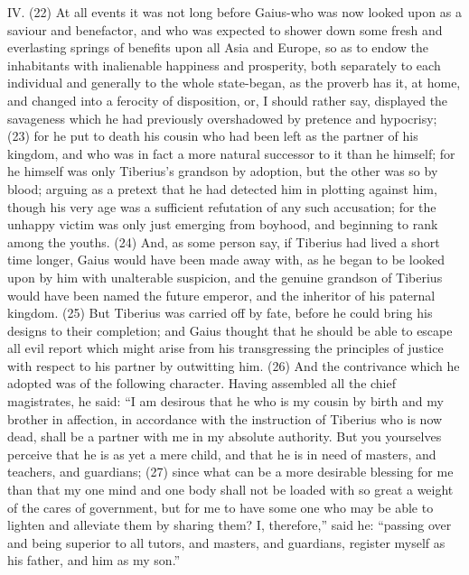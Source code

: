 IV. (22) At all events it was not long before Gaius-who was now looked upon as a saviour and
benefactor, and who was expected to shower down some fresh and everlasting springs of benefits
upon all Asia and Europe, so as to endow the inhabitants with inalienable happiness and prosperity,
both separately to each individual and generally to the whole state-began, as the proverb has it, at
home, and changed into a ferocity of disposition, or, I should rather say, displayed the savageness
which he had previously overshadowed by pretence and hypocrisy; (23) for he put to death his
cousin who had been left as the partner of his kingdom, and who was in fact a more natural
successor to it than he himself; for he himself was only Tiberius's grandson by adoption, but the
other was so by blood; arguing as a pretext that he had detected him in plotting against him, though
his very age was a sufficient refutation of any such accusation; for the unhappy victim was only
just emerging from boyhood, and beginning to rank among the youths. (24) And, as some person
say, if Tiberius had lived a short time longer, Gaius would have been made away with, as he began
to be looked upon by him with unalterable suspicion, and the genuine grandson of Tiberius would
have been named the future emperor, and the inheritor of his paternal kingdom. (25) But Tiberius
was carried off by fate, before he could bring his designs to their completion; and Gaius thought
that he should be able to escape all evil report which might arise from his transgressing the
principles of justice with respect to his partner by outwitting him. (26) And the contrivance which he
adopted was of the following character. Having assembled all the chief magistrates, he said: ``I am
desirous that he who is my cousin by birth and my brother in affection, in accordance with the
instruction of Tiberius who is now dead, shall be a partner with me in my absolute authority. But you
yourselves perceive that he is as yet a mere child, and that he is in need of masters, and teachers,
and guardians; (27) since what can be a more desirable blessing for me than that my one mind and
one body shall not be loaded with so great a weight of the cares of government, but for me to have
some one who may be able to lighten and alleviate them by sharing them? I, therefore,'' said he:
``passing over and being superior to all tutors, and masters, and guardians, register myself as his
father, and him as my son.''

